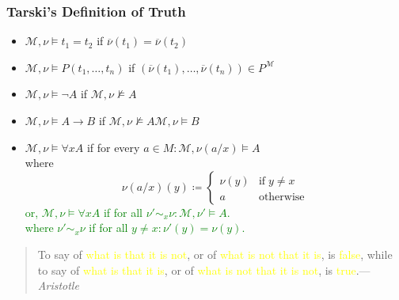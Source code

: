\documentclass[UTF8,11pt,colorlinks,compress,openany]{beamer}%
\begin{document}
\begin{frame}\frametitle{Tarski's Definition of Truth}
		\begin{definition}
			\begin{itemize}
				\item $\mathcal{M},\nu\vDash t_1=t_2$ if $\overline{\nu}(t_1)=\overline{\nu}(t_2)$
				\item $\mathcal{M},\nu\vDash P(t_1,\dots,t_n)$ if $(\overline{\nu}(t_1),\dots,\overline{\nu}(t_n))\in P^{\mathcal{M}}$
				\item $\mathcal{M},\nu\vDash\neg A$ if $\mathcal{M},\nu\nvDash A$
				\item $\mathcal{M},\nu\vDash A\to B$ if $\mathcal{M},\nu\nvDash A$\;\;\;\;$\mathcal{M},\nu\vDash B$
				\item $\mathcal{M},\nu\vDash\forall x A$ if for every $a\in M: \mathcal{M},\nu(a/x)\vDash A$\\
				where
				\[\nu(a/x)(y)\coloneqq 
				\begin{cases}
				\nu(y) &\text{if}\;y\neq x\\
				a &\text{otherwise}
				\end{cases}\]
				\textcolor{green}{or,
					$\mathcal{M},\nu\vDash\forall x A$ if for all $\nu'\sim_x\nu: \mathcal{M},\nu'\vDash A$.\\
					where $\nu'\sim_x\nu$ if for all $y\neq x:\nu'(y)=\nu(y)$.}
			\end{itemize}
		\end{definition}
	\begin{quote}
	To say of \textcolor{yellow}{what is that it is not}, or of \textcolor{yellow}{what is not that it is}, is \textcolor{yellow}{false}, while to say of \textcolor{yellow}{what is that it is}, or of \textcolor{yellow}{what is not that it is not}, is \textcolor{yellow}{true}.\hfill --- \textsl{Aristotle}
	\end{quote}
\end{frame}
\end{document}
